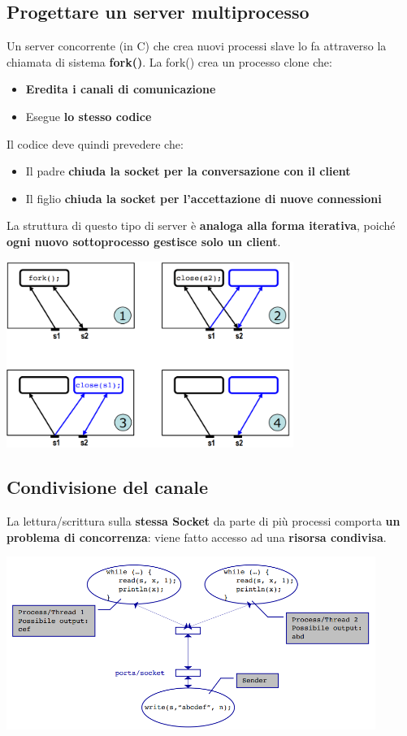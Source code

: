 \documentclass[12pt]{article}
\begin{document}
\subsection{Progettare un server multiprocesso}
Un server concorrente (in C) che crea nuovi processi slave lo fa attraverso la chiamata di sistema \textbf{fork()}. La fork() crea un processo clone che:
\begin{itemize}
    \item \textbf{Eredita i canali di comunicazione}
    \item Esegue \textbf{lo stesso codice}
\end{itemize}
Il codice deve quindi prevedere che:
\begin{itemize}
    \item Il padre \textbf{chiuda la socket per la conversazione con il client}
    \item Il figlio \textbf{chiuda la socket per l'accettazione di nuove connessioni}
\end{itemize}
La struttura di questo tipo di server è \textbf{analoga alla forma iterativa}, poiché \textbf{ogni nuovo sottoprocesso gestisce solo un client}.
\begin{center}
    \includegraphics[width = 0.70\textwidth]{Images/42.PNG}
\end{center}
\subsection{Condivisione del canale}
La lettura/scrittura sulla \textbf{stessa Socket} da parte di più processi comporta \textbf{un problema di concorrenza}: viene fatto accesso ad una \textbf{risorsa condivisa}.
\begin{center}
    \includegraphics[width = 0.90\textwidth]{Images/43.PNG}
\end{center}
\end{document}

